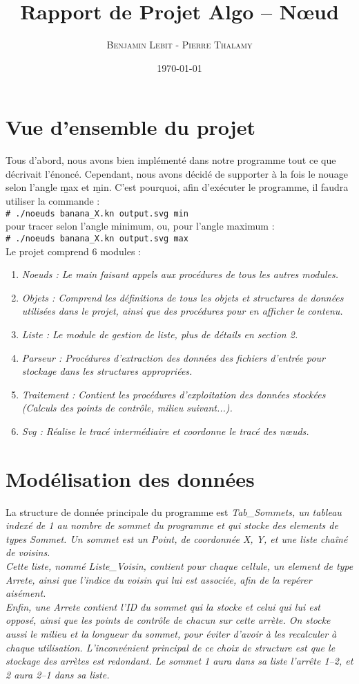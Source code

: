 \documentclass[10.9pt]{article}
\title{Rapport de Projet Algo -- Nœud}
\author{\textsc{Benjamin Lebit} - \textsc{Pierre Thalamy}}
\date{\today}
\newcommand{\shellcmd}[1]{\\\indent\indent\texttt{\footnotesize\# #1}\\}
\begin{document}
\maketitle

\section {Vue d'ensemble du projet}
Tous d'abord, nous avons bien implémenté dans notre programme tout ce
que décrivait l'énoncé. Cependant, nous avons décidé de supporter à la
fois le nouage selon l'angle \b{max} et \b{min}. C'est pourquoi, afin
d'exécuter le programme, il faudra utiliser la commande :
\shellcmd{./noeuds banana\_X.kn output.svg min} 
pour tracer selon l'angle minimum, ou, pour l'angle maximum :
\shellcmd{./noeuds banana\_X.kn output.svg max} 

Le projet comprend 6 modules :
\begin{enumerate}
\item \em{Noeuds} : Le main faisant appels aux procédures de tous
  les autres modules.
\item \em{Objets} : Comprend les définitions de tous les objets et
  structures de données utilisées dans le projet, ainsi que des
  procédures pour en afficher le contenu.
\item \em{Liste} : Le module de gestion de liste, plus de détails en
  section 2.
\item \em{Parseur} : Procédures d'extraction des données des fichiers
  d'entrée pour stockage dans les structures appropriées.
\item \em{Traitement} : Contient les procédures d'exploitation des
  données stockées (Calculs des points de contrôle, milieu
  suivant...).
\item \em{Svg} : Réalise le tracé intermédiaire et coordonne le tracé des nœuds.
\end{enumerate}

\section {Modélisation des données}
La structure de donnée principale du programme est \em{Tab\_Sommets},
un tableau indexé de 1 au nombre de sommet du programme et qui stocke
des elements de types \em{Sommet}. Un sommet est un \em{Point}, de
coordonnée \em{X, Y}, et une liste chaîné de voisins. \\
Cette liste, nommé \em{Liste\_Voisin}, contient pour chaque cellule,
un element de type \em{Arrete}, ainsi que l'indice du voisin qui lui
est associée, afin de la repérer aisément. \\
Enfin, une \em{Arrete} contient l'ID du sommet qui la stocke et celui
qui lui est opposé, ainsi que les points de contrôle de chacun sur
cette arrète. On stocke aussi le milieu et la longueur du sommet, pour
éviter d'avoir à les recalculer à chaque utilisation. L'inconvénient
principal de ce choix de structure est que le stockage des arrètes est
redondant. Le sommet 1 aura dans sa liste l'arrête 1--2, et 2 aura
2--1 dans sa liste.
\end{document}
